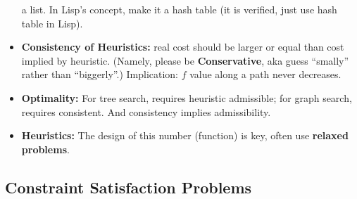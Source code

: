 \documentclass[twocolumn]{article}
\begin{document}
\begin{itemize}
  a list. In Lisp's concept, make it a hash table (it is verified,
  just use hash table in Lisp).
\item \textbf{Consistency of Heuristics:} real cost should be larger
  or equal than cost implied by heuristic. (Namely, please be
  \textbf{Conservative}, aka guess ``smally'' rather than
  ``biggerly''.) Implication: $f$ value along a path never decreases. 
\item \textbf{Optimality:} For tree search, requires heuristic
  admissible; for graph search, requires consistent. And consistency
  implies admissibility.
\item \textbf{Heuristics:} The design of this number (function) is
  key, often use \textbf{relaxed problems}.
\end{itemize}

\subsection{Constraint Satisfaction Problems}
\label{sec:constr-satisf-probl}
\end{document}
